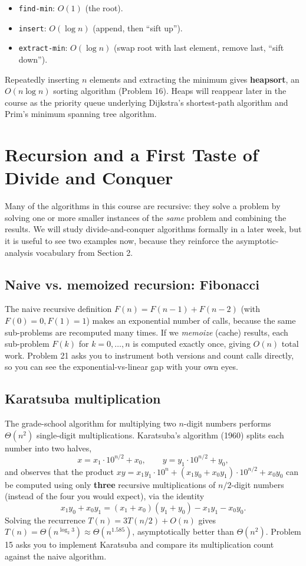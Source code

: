 \documentclass[11pt]{article}
\begin{document}
\begin{itemize}
    \item \texttt{find-min}: $O(1)$ (the root).
    \item \texttt{insert}: $O(\log n)$ (append, then ``sift up'').
    \item \texttt{extract-min}: $O(\log n)$ (swap root with last element, remove last,
    ``sift down'').
\end{itemize}

Repeatedly inserting $n$ elements and extracting the minimum gives \textbf{heapsort}, an
$O(n \log n)$ sorting algorithm (Problem 16). Heaps will reappear later in the course as
the priority queue underlying Dijkstra's shortest-path algorithm and Prim's minimum
spanning tree algorithm.

\section{Recursion and a First Taste of Divide and Conquer}

Many of the algorithms in this course are recursive: they solve a problem by solving one
or more smaller instances of the \emph{same} problem and combining the results. We will
study divide-and-conquer algorithms formally in a later week, but it is useful to see two
examples now, because they reinforce the asymptotic-analysis vocabulary from Section 2.

\subsection{Naive vs. memoized recursion: Fibonacci}

The naive recursive definition $F(n) = F(n-1) + F(n-2)$ (with $F(0)=0, F(1)=1$) makes an
exponential number of calls, because the same sub-problems are recomputed many times. If
we \emph{memoize} (cache) results, each sub-problem $F(k)$ for $k = 0, \dots, n$ is
computed exactly once, giving $O(n)$ total work. Problem 21 asks you to instrument both
versions and count calls directly, so you can see the exponential-vs-linear gap with your
own eyes.

\subsection{Karatsuba multiplication}

The grade-school algorithm for multiplying two $n$-digit numbers performs $\Theta(n^2)$
single-digit multiplications. Karatsuba's algorithm (1960) splits each number into two
halves,
\[
  x = x_1 \cdot 10^{n/2} + x_0, \qquad y = y_1 \cdot 10^{n/2} + y_0,
\]
and observes that the product $xy = x_1 y_1 \cdot 10^{n} + (x_1y_0 + x_0y_1)\cdot 10^{n/2} +
x_0 y_0$ can be computed using only \textbf{three} recursive multiplications of $n/2$-digit
numbers (instead of the four you would expect), via the identity
\[
  x_1y_0 + x_0y_1 = (x_1+x_0)(y_1+y_0) - x_1y_1 - x_0y_0.
\]
Solving the recurrence $T(n) = 3T(n/2) + O(n)$ gives $T(n) = \Theta(n^{\log_2 3}) \approx
\Theta(n^{1.585})$, asymptotically better than $\Theta(n^2)$. Problem 15 asks you to
implement Karatsuba and compare its multiplication count against the naive algorithm.
\end{document}
